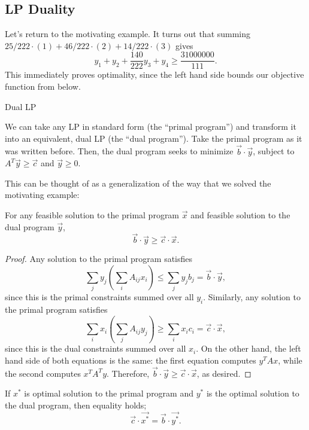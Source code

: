 \subsection{LP Duality}

Let's return to the motivating example. It turns out that summing $25/222\cdot (1) + 46/222\cdot (2) + 14/222\cdot (3)$ gives
\[y_1+y_2+\frac{140}{222}y_3+y_4\geq \frac{31000000}{111}.\]
This immediately proves optimality, since the left hand side bounds our objective function from below. 

\begin{definition}

Dual LP
\end{definition}

We can take any LP in standard form (the ``primal program'') and transform it into an equivalent, dual LP (the ``dual program''). Take the primal program as it was written before. Then, the dual program seeks to minimize $\Vec{b}\cdot \Vec{y}$, subject to $A^T\Vec{y}\geq \Vec{c}$ and $\Vec{y}\geq 0$.

This can be thought of as a generalization of the way that we solved the motivating example:

\begin{example}
\exlabel


\end{example}

\begin{theorem}

For any feasible solution to the primal program $\Vec{x}$ and feasible solution to the dual program $\Vec{y}$, 
\[\Vec{b}\cdot \Vec{y}\geq \Vec{c}\cdot \Vec{x}.\]
\end{theorem}

\begin{proof}
Any solution to the primal program satisfies
\[\sum_j y_j\left(\sum_i A_{ij}x_i\right)\leq \sum_j y_jb_j = \Vec{b}\cdot \Vec{y},\]
since this is the primal constraints summed over all $y_i$. Similarly, any solution to the primal program satisfies
\[\sum_i x_i\left(\sum_j A_{ij}y_j\right)\geq \sum_i x_ic_i = \Vec{c}\cdot \Vec{x},\]
since this is the dual constraints summed over all $x_i$. On the other hand, the left hand side of both equations is the same: the first equation computes $y^TAx$, while the second computes $x^TA^Ty$. Therefore, $\Vec{b}\cdot \Vec{y}\geq \Vec{c}\cdot \Vec{x}$, as desired.
\end{proof}

\begin{theorem}

If $x^*$ is optimal solution to the primal program and $y^*$ is the optimal solution to the dual program, then equality holds; 
\[\Vec{c}\cdot \Vec{x^*} = \Vec{b}\cdot \Vec{y^*}.\]
\end{theorem}

